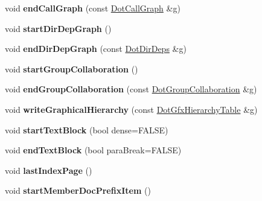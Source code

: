 \begin{DoxyCompactItemize}
\item 
\mbox{\label{class_output_list_a2160091a5419feb730f13235a9c9dd35}} 
void {\bfseries end\+Call\+Graph} (const \mbox{\hyperlink{class_dot_call_graph}{Dot\+Call\+Graph}} \&g)
\item 
\mbox{\label{class_output_list_a6ecc6dca9d8d4bc9720971ffc1c5b788}} 
void {\bfseries start\+Dir\+Dep\+Graph} ()
\item 
\mbox{\label{class_output_list_a69e7c01869fe88fef10d8e1421338df9}} 
void {\bfseries end\+Dir\+Dep\+Graph} (const \mbox{\hyperlink{class_dot_dir_deps}{Dot\+Dir\+Deps}} \&g)
\item 
\mbox{\label{class_output_list_a41473666261dc8b245cb4daee6bc53a0}} 
void {\bfseries start\+Group\+Collaboration} ()
\item 
\mbox{\label{class_output_list_affe8200bbc33f816a08fac312b5c4f57}} 
void {\bfseries end\+Group\+Collaboration} (const \mbox{\hyperlink{class_dot_group_collaboration}{Dot\+Group\+Collaboration}} \&g)
\item 
\mbox{\label{class_output_list_aef6975bd197d7c66b5ddbacff8717b61}} 
void {\bfseries write\+Graphical\+Hierarchy} (const \mbox{\hyperlink{class_dot_gfx_hierarchy_table}{Dot\+Gfx\+Hierarchy\+Table}} \&g)
\item 
\mbox{\label{class_output_list_a5e4b1b0039100083a979ff8d90adce58}} 
void {\bfseries start\+Text\+Block} (bool dense=F\+A\+L\+SE)
\item 
\mbox{\label{class_output_list_a06ee92661f22a8e270e6b1cc538773b5}} 
void {\bfseries end\+Text\+Block} (bool para\+Break=F\+A\+L\+SE)
\item 
\mbox{\label{class_output_list_a9edb8dc61594b5f30bb7f4b004b04f41}} 
void {\bfseries last\+Index\+Page} ()
\item 
\mbox{\label{class_output_list_acc616cc002e406c1c5816f020fb7d60c}} 
void {\bfseries start\+Member\+Doc\+Prefix\+Item} ()
\item 

\end{DoxyCompactItemize}
